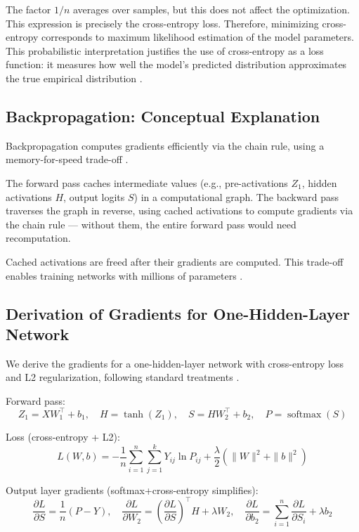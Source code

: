 \documentclass[sigconf,screen,nonacm,nofonts]{acmart}
\begin{document}
The factor \(1/n\) averages over samples, but this does not affect the optimization. This expression is precisely the cross-entropy loss. Therefore, minimizing cross-entropy corresponds to maximum likelihood estimation of the model parameters. This probabilistic interpretation justifies the use of cross-entropy as a loss function: it measures how well the model's predicted distribution approximates the true empirical distribution \cite{deisenroth2020mml, goodfellow2016deep}.

\subsection{Backpropagation: Conceptual Explanation}

Backpropagation computes gradients efficiently via the chain rule, using a memory-for-speed trade-off \cite{cs231n_backprop}.

The forward pass caches intermediate values (e.g., pre-activations \(Z_1\), hidden activations \(H\), output logits \(S\)) in a computational graph. The backward pass traverses the graph in reverse, using cached activations to compute gradients via the chain rule — without them, the entire forward pass would need recomputation.

Cached activations are freed after their gradients are computed. This trade-off enables training networks with millions of parameters \cite{murphy2022pml}.

\subsection{Derivation of Gradients for One-Hidden-Layer Network}

We derive the gradients for a one-hidden-layer network with cross-entropy loss and L2 regularization, following standard treatments \cite{goodfellow2016deep}.

Forward pass:
\[
Z_1 = XW_1^\top + b_1,\quad H = \tanh(Z_1),\quad S = HW_2^\top + b_2,\quad P = \operatorname{softmax}(S)
\]

Loss (cross-entropy + L2):
\[
L(W, b) = -\frac{1}{n}\sum_{i=1}^n\sum_{j=1}^k Y_{ij}\ln P_{ij} + \frac{\lambda}{2}\left(\|W\|^2 + \|b\|^2\right)
\]

Output layer gradients (softmax+cross-entropy simplifies):
\[
\frac{\partial L}{\partial S} = \frac{1}{n}(P - Y),\quad
\frac{\partial L}{\partial W_2} = \left(\frac{\partial L}{\partial S}\right)^\top H + \lambda W_2,\quad
\frac{\partial L}{\partial b_2} = \sum_{i=1}^n \frac{\partial L}{\partial S_i} + \lambda b_2
\]
\end{document}
